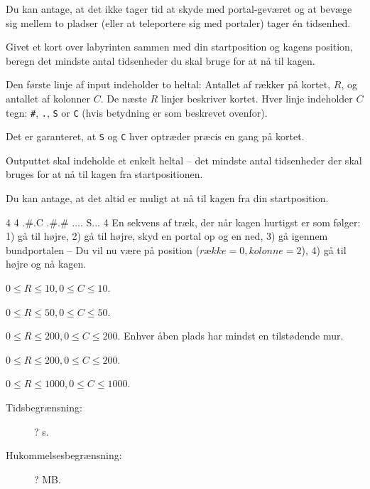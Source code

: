 \documentclass{boi2014-dk}
\newcommand{\constant}[1]{{\tt #1}}
\begin{document}
    Du kan antage, at det ikke tager tid at skyde med portal-geværet og at
    bevæge sig mellem to pladser (eller at teleportere sig med portaler) tager
    én tidsenhed.

    \Task
    Givet et kort over labyrinten sammen med din startposition og kagens
    position, beregn det mindste antal tidsenheder du skal bruge for at nå til
    kagen.

    \Input
    Den første linje af input indeholder to heltal: Antallet af rækker på
    kortet, $R$, og antallet af kolonner $C$. De næste $R$ linjer beskriver
    kortet. Hver linje indeholder $C$ tegn: \constant{\#},
    \constant{.}, \constant{S} or \constant{C} (hvis betydning er som beskrevet
    ovenfor).

    Det er garanteret, at \constant{S} og \constant{C} hver optræder præcis en
    gang på kortet.

    \Output
    Outputtet skal indeholde et enkelt heltal -- det mindste antal tidsenheder
    der skal bruges for at nå til kagen fra startpositionen.

    Du kan antage, at det altid er muligt at nå til kagen fra din
    startposition.

    \Example
    \example
    {
        4 4\newline
        .\#.C\newline
        .\#.\#\newline
        ....\newline
        S...
    }
    {
        4
    }
    {
        En sekvens af træk, der når kagen hurtigst er som følger: 1) gå til
        højre, 2) gå til højre, skyd en portal op og en ned, 3) gå igennem
        bundportalen -- Du vil nu være på position ($række = 0, kolonne = 2$),
        4) gå til højre og nå kagen.
    }

    \Scoring

    \begin{description}[leftmargin=0pt]
        \item[Delopgave 1 (? point):] $0 \le R \le 10, 0 \le C \le 10$.
        \item[Delopgave 2 (? point):] $0 \le R \le 50, 0 \le C \le 50$.
        \item[Delopgave 3 (? point):] $0 \le R \le 200, 0 \le C \le 200$.
            Enhver åben plads har mindst en tilstødende mur.
        \item[Delopgave 4 (? point):] $0 \le R \le 200, 0 \le C \le 200$.
        \item[Delopgave 5 (? point):] $0 \le R \le 1000, 0 \le C \le 1000$.
    \end{description}

    \Constraints

    \begin{description}
        \item[Tidsbegrænsning:] ? s.
        \item[Hukommelsesbegrænsning:] ? MB.
    \end{description}
\end{document}
